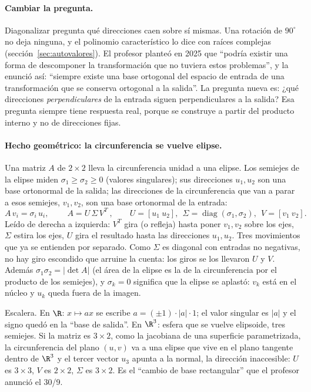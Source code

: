 \paragraph{Cambiar la pregunta.} Diagonalizar pregunta qué direcciones caen sobre sí
mismas. Una rotación de \(90^\circ\) no deja ninguna, y el polinomio característico lo dice
con raíces complejas (sección~\ref{sec:autovalores}). El profesor planteó en 2025 que
``podría existir una forma de descomponer la transformación que no tuviera estos
problemas'', y la enunció así: ``siempre existe una base ortogonal del espacio de entrada
de una transformación que se conserva ortogonal a la salida''. La pregunta nueva es:
¿qué direcciones \emph{perpendiculares} de la entrada siguen perpendiculares a la salida?
Esa pregunta siempre tiene respuesta real, porque se construye a partir del producto
interno y no de direcciones fijas.

\paragraph{Hecho geométrico: la circunferencia se vuelve elipse.} Una matriz \(A\) de
\(2\times2\) lleva la circunferencia unidad a una elipse. Los semiejes de la elipse miden
\(\sigma_1\ge\sigma_2\ge0\) (valores singulares); sus direcciones \(u_1,u_2\) son una base
ortonormal de la salida; las direcciones de la circunferencia que van a parar a esos
semiejes, \(v_1,v_2\), son una base ortonormal de la entrada:
\[
  A\,v_i=\sigma_i\,u_i,\qquad
  \boxed{\ A=U\,\Sigma\,V^T\ },\qquad
  U=[u_1\ u_2],\ \ \Sigma=\operatorname{diag}(\sigma_1,\sigma_2),\ \ V=[v_1\ v_2].
\]
Leído de derecha a izquierda: \(V^T\) gira (o refleja) hasta poner \(v_1,v_2\) sobre los
ejes, \(\Sigma\) estira los ejes, \(U\) gira el resultado hasta las direcciones
\(u_1,u_2\). Tres movimientos que ya se entienden por separado. Como \(\Sigma\) es diagonal
con entradas no negativas, no hay giro escondido que arruine la cuenta: los giros se los
llevaron \(U\) y \(V\). Además \(\sigma_1\sigma_2=|\det A|\) (el área de la elipse es la de
la circunferencia por el producto de los semiejes), y \(\sigma_k=0\) significa que la
elipse se aplastó: \(v_k\) está en el núcleo y \(u_k\) queda fuera de la imagen.

Escalera. En \(\R\): \(x\mapsto ax\) se escribe \(a=(\pm1)\cdot|a|\cdot1\); el valor
singular es \(|a|\) y el signo quedó en la ``base de salida''. En \(\R^3\): esfera que se
vuelve elipsoide, tres semiejes. Si la matriz es \(3\times2\), como la jacobiana de una
superficie parametrizada, la circunferencia del plano \((u,v)\) va a una elipse que vive en
el plano tangente dentro de \(\R^3\) y el tercer vector \(u_3\) apunta a la normal, la
dirección inaccesible: \(U\) es \(3\times3\), \(V\) es \(2\times2\), \(\Sigma\) es
\(3\times2\). Es el ``cambio de base rectangular'' que el profesor anunció el 30/9.

